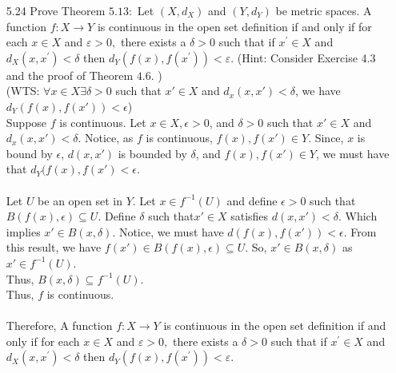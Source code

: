 \documentclass[12pt]{article}
\begin{document}
\begin{enumerate}
		\item[5.24] Prove Theorem $5.13 :$ Let $\left( X , d _ { X } \right)$ and $\left( Y , d _ { Y } \right)$ be metric spaces. A function
		$f : X \rightarrow Y$ is continuous in the open set definition if and only if for each $x \in X$ and $\varepsilon > 0 ,$ there exists a $\delta > 0$ such that if $x ^ { \prime } \in X$ and $d_X \left( x , x ^ { \prime } \right) < \delta$
		then $d _ { Y } \left( f ( x ) , f \left( x ^ { \prime } \right) \right) < \varepsilon .$ (Hint: Consider Exercise 4.3 and the proof of
		Theorem $4.6 .$ )\\
		(WTS: $\forall x\in X \exists \delta >0$ such that $ x'\in X $ and $ d_x(x,x')< \delta$, we have $ d_Y(f(x),f(x'))<\epsilon $)\\
		Suppose $ f $ is continuous. Let $ x\in X , \epsilon >0 $, and $ \delta > 0 $ such that $ x' \in X $ and $ d_x(x,x') < \delta $. Notice, as $ f $ is continuous, $ f(x), f(x')\in Y $. Since, $ x $ is bound by $\epsilon$, $ d(x,x') $ is bounded by $ \delta $, and $ f(x),f(x')\in Y $, we must have that $ d_Y(f(x),f(x') < \epsilon $.\\
		\\
		Let $ U $ be an open set in $ Y $. Let $ x\in f^{-1}(U) $ and define $ \epsilon > 0 $ such that $B(f(x),\epsilon)\subseteq U $. Define $ \delta $ such that$ x'\in X$ satisfies $ d(x,x')<\delta $. Which implies $ x'\in B(x,\delta) $. Notice, we must have $ d(f(x),f(x'))<\epsilon $. From this result, we have $ f(x')\in B(f(x),\epsilon)\subseteq U $. So, $ x'\in B(x,\delta) $ as $ x'\in f^{-1}(U) $.\\
		Thus, $ B(x,\delta) \subseteq f^{-1}(U) $.\\
		Thus, $ f $ is continuous.\\
		\\
		Therefore, A function
		$f : X \rightarrow Y$ is continuous in the open set definition if and only if for each $x \in X$ and $\varepsilon > 0 ,$ there exists a $\delta > 0$ such that if $x ^ { \prime } \in X$ and $d_X \left( x , x ^ { \prime } \right) < \delta$
		then $d _ { Y } \left( f ( x ) , f \left( x ^ { \prime } \right) \right) < \varepsilon .$
		

\end{enumerate}
\end{document}
